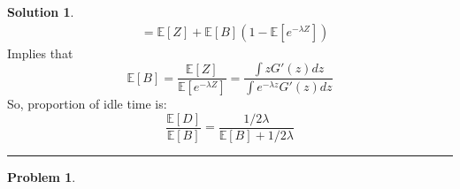 \documentclass[a4paper, 10pt]{article}
\theoremstyle{definition}
\newtheorem{problem}{Problem}
\theoremstyle{hSol}
\newtheorem*{solution}{Solution}
\begin{document}
\begin{solution}
\begin{equation}
\begin{split}
    &= \mathbb{E}\left[Z\right] + \mathbb{E}\left[B\right](1- \mathbb{E}\left[e^{-\lambda Z}\right])
  \end{split}
\end{equation}
Implies that
\begin{equation}
  \mathbb{E}\left[B\right] = \frac{\mathbb{E}\left[Z\right]}{\mathbb{E}\left[e^{-\lambda Z}\right]} = \frac{\int zG'(z)dz}{\int e^{-\lambda z}G'(z)dz}
\end{equation}
So, proportion of idle time is:
\begin{equation}
  \frac{\mathbb{E}\left[D\right]}{\mathbb{E}\left[B\right]} = \frac{1/2 \lambda}{\mathbb{E}\left[B\right]+1/2 \lambda}
\end{equation}
\end{solution}

\noindent\rule{16cm}{0.4pt}
\begin{problem} 
\end{problem}
\end{document}
